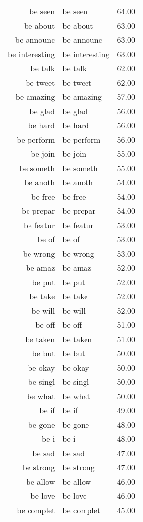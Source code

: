 \begin{table}[ht]
\begin{tabular}{rlr}
  be seen & be seen & 64.00 \\ 
  be about & be about & 63.00 \\ 
  be announc & be announc & 63.00 \\ 
  be interesting & be interesting & 63.00 \\ 
  be talk & be talk & 62.00 \\ 
  be tweet & be tweet & 62.00 \\ 
  be amazing & be amazing & 57.00 \\ 
  be glad & be glad & 56.00 \\ 
  be hard & be hard & 56.00 \\ 
  be perform & be perform & 56.00 \\ 
  be join & be join & 55.00 \\ 
  be someth & be someth & 55.00 \\ 
  be anoth & be anoth & 54.00 \\ 
  be free & be free & 54.00 \\ 
  be prepar & be prepar & 54.00 \\ 
  be featur & be featur & 53.00 \\ 
  be of & be of & 53.00 \\ 
  be wrong & be wrong & 53.00 \\ 
  be amaz & be amaz & 52.00 \\ 
  be put & be put & 52.00 \\ 
  be take & be take & 52.00 \\ 
  be will & be will & 52.00 \\ 
  be off & be off & 51.00 \\ 
  be taken & be taken & 51.00 \\ 
  be but & be but & 50.00 \\ 
  be okay & be okay & 50.00 \\ 
  be singl & be singl & 50.00 \\ 
  be what & be what & 50.00 \\ 
  be if & be if & 49.00 \\ 
  be gone & be gone & 48.00 \\ 
  be i & be i & 48.00 \\ 
  be sad & be sad & 47.00 \\ 
  be strong & be strong & 47.00 \\ 
  be allow & be allow & 46.00 \\ 
  be love & be love & 46.00 \\ 
  be complet & be complet & 45.00 \\ 

\end{tabular}
\end{table}
